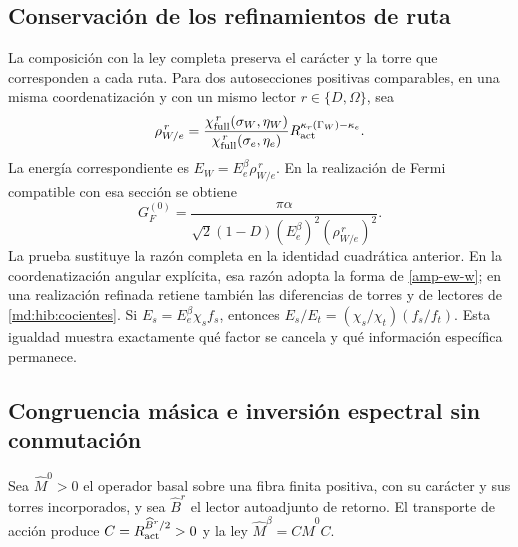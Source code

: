 \subsection{Conservación de los refinamientos de ruta}
\label{amp-ew-refinamiento}
La composición con la ley completa preserva el carácter y la torre que
corresponden a cada ruta. Para dos autosecciones positivas comparables,
en una misma coordenatización y con un mismo lector $r\in\{D,\Omega\}$, sea
\begin{equation}
 \rho_{W/e}^{\,r}
 =\frac{\chi_{\rm full}^{\,r}(\sigma_W,\eta_W)}
        {\chi_{\rm full}^{\,r}(\sigma_e,\eta_e)}
 R_{\rm act}^{\kappa_r(\Gamma_W)-\kappa_e}.
 \label{amp-ew-razon-completa}
\end{equation}
La energía correspondiente es $E_W=E_e^\beta\rho_{W/e}^{\,r}$.
En la realización de Fermi compatible con esa sección se obtiene
\begin{equation}
 G_F^{(0)}=
 \frac{\pi\alpha}
 {\sqrt2(1-D)(E_e^\beta)^2(\rho_{W/e}^{\,r})^2}.
 \label{amp-ew-fermi-completo}
\end{equation}
La prueba sustituye la razón completa en la identidad cuadrática
anterior. En la coordenatización angular explícita, esa razón adopta la forma de
\eqref{amp-ew-w}; en una realización refinada retiene también las
diferencias de torres y de lectores de \eqref{md:hib:cocientes}.
Si $E_s=E_e^\beta\chi_sf_s$, entonces
$E_s/E_t=(\chi_s/\chi_t)(f_s/f_t)$. Esta igualdad muestra exactamente
qué factor se cancela y qué información específica permanece.

\subsection{Congruencia másica e inversión espectral sin conmutación}
\label{amp-ew-congruencia}
Sea $\widehat M^0>0$ el operador basal sobre una fibra finita positiva,
con su carácter y sus torres incorporados, y sea $\widehat B^r$
el lector autoadjunto de retorno. El transporte de acción produce
$C=R_{\rm act}^{\widehat B^r/2}>0$ y la ley
$\widehat M^\beta=C\widehat M^0C$.

